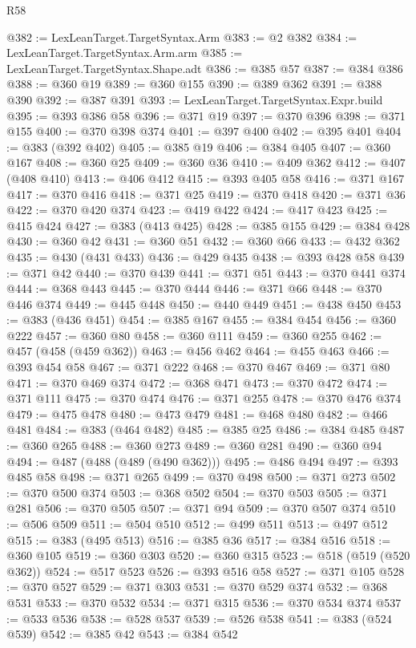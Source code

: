 \begin{lexlean}{R58}
\begin{coremodule}
@382 := LexLeanTarget.TargetSyntax.Arm
@383 := @2 @382
@384 := LexLeanTarget.TargetSyntax.Arm.arm
@385 := LexLeanTarget.TargetSyntax.Shape.adt
@386 := @385 @57
@387 := @384 @386
@388 := @360 @19
@389 := @360 @155
@390 := @389 @362
@391 := @388 @390
@392 := @387 @391
@393 := LexLeanTarget.TargetSyntax.Expr.build
@395 := @393 @386 @58
@396 := @371 @19
@397 := @370 @396
@398 := @371 @155
@400 := @370 @398 @374
@401 := @397 @400
@402 := @395 @401
@404 := @383 (@392 @402)
@405 := @385 @19
@406 := @384 @405
@407 := @360 @167
@408 := @360 @25
@409 := @360 @36
@410 := @409 @362
@412 := @407 (@408 @410)
@413 := @406 @412
@415 := @393 @405 @58
@416 := @371 @167
@417 := @370 @416
@418 := @371 @25
@419 := @370 @418
@420 := @371 @36
@422 := @370 @420 @374
@423 := @419 @422
@424 := @417 @423
@425 := @415 @424
@427 := @383 (@413 @425)
@428 := @385 @155
@429 := @384 @428
@430 := @360 @42
@431 := @360 @51
@432 := @360 @66
@433 := @432 @362
@435 := @430 (@431 @433)
@436 := @429 @435
@438 := @393 @428 @58
@439 := @371 @42
@440 := @370 @439
@441 := @371 @51
@443 := @370 @441 @374
@444 := @368 @443
@445 := @370 @444
@446 := @371 @66
@448 := @370 @446 @374
@449 := @445 @448
@450 := @440 @449
@451 := @438 @450
@453 := @383 (@436 @451)
@454 := @385 @167
@455 := @384 @454
@456 := @360 @222
@457 := @360 @80
@458 := @360 @111
@459 := @360 @255
@462 := @457 (@458 (@459 @362))
@463 := @456 @462
@464 := @455 @463
@466 := @393 @454 @58
@467 := @371 @222
@468 := @370 @467
@469 := @371 @80
@471 := @370 @469 @374
@472 := @368 @471
@473 := @370 @472
@474 := @371 @111
@475 := @370 @474
@476 := @371 @255
@478 := @370 @476 @374
@479 := @475 @478
@480 := @473 @479
@481 := @468 @480
@482 := @466 @481
@484 := @383 (@464 @482)
@485 := @385 @25
@486 := @384 @485
@487 := @360 @265
@488 := @360 @273
@489 := @360 @281
@490 := @360 @94
@494 := @487 (@488 (@489 (@490 @362)))
@495 := @486 @494
@497 := @393 @485 @58
@498 := @371 @265
@499 := @370 @498
@500 := @371 @273
@502 := @370 @500 @374
@503 := @368 @502
@504 := @370 @503
@505 := @371 @281
@506 := @370 @505
@507 := @371 @94
@509 := @370 @507 @374
@510 := @506 @509
@511 := @504 @510
@512 := @499 @511
@513 := @497 @512
@515 := @383 (@495 @513)
@516 := @385 @36
@517 := @384 @516
@518 := @360 @105
@519 := @360 @303
@520 := @360 @315
@523 := @518 (@519 (@520 @362))
@524 := @517 @523
@526 := @393 @516 @58
@527 := @371 @105
@528 := @370 @527
@529 := @371 @303
@531 := @370 @529 @374
@532 := @368 @531
@533 := @370 @532
@534 := @371 @315
@536 := @370 @534 @374
@537 := @533 @536
@538 := @528 @537
@539 := @526 @538
@541 := @383 (@524 @539)
@542 := @385 @42
@543 := @384 @542

\end{coremodule}
\end{lexlean}
